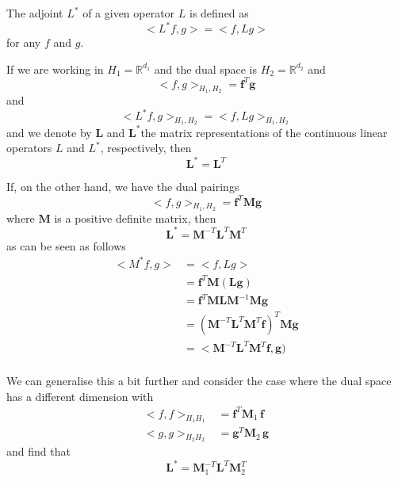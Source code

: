 \documentclass[10pt,a4paper]{book}
\begin{document}
The adjoint $L^\ast$ of a given operator $L$ is defined as
\[
< L^\ast f, g > =< f, L g>  
\]
for any $f$ and $g$. 

If we are working in $H_1=\mathbb{R}^{d_1}$ and the dual space is
$H_2=\mathbb{R}^{d_2}$ and
\[
 < f ,g >_{H_1 , H_2} = \bm{f}^T \bm{g}
\]
and
\[
< L^\ast f, g >_{H_1 , H_2}  =< f, L g>_{H_1 , H_2}   
\]
and we denote by $\bm{L}$ and $\bm{L}^\ast$the matrix representations
of the continuous linear operators $L$ and $L^\ast$, respectively,
then 
\[
 \bm{L}^\ast = \bm{L}^T
\]

If,  on the other hand, we have the dual pairings
\[
 < f ,g >_{H_1 , H_2}  = \bm{f}^T \bm{M} \bm{g}
\]
where $\bm{M}$ is a positive definite matrix, then
\[
\bm{L}^\ast=\bm{M}^{-T} \bm{L}^T \bm{M}^T
\] 
as can be seen as follows
\begin{align*}
 <M^\ast f, g> &= < f, L g> \\
              &= \bm{f}^T \bm{M} ( \bm{L} \bm{g}) \\
              &= \bm{f}^T \bm{M} \bm{L} \bm{M}^{-1} \bm{M}  \bm{g} \\
              &= (\bm{M}^{-T} \bm{L}^T \bm{M}^T \bm{f})^T  \bm{M}  \bm{g} \\
              &= <\bm{M}^{-T} \bm{L}^T \bm{M}^T \bm{f} ,  \bm{g}) \\
\end{align*}

We can generalise this a bit further and consider the case where the
dual space has a different dimension with
\begin{align*}
  <f,f>_{H_1 H_1} &= \bm{f}^T \bm{M}_1 \,\bm{f} \\
  <g,g>_{H_2 H_2} &= \bm{g}^T \bm{M}_2 \, \bm{g}
\end{align*}
and find that 
\[
\bm{L}^\ast=\bm{M}_1^{-T} \bm{L}^T \bm{M}_2^T
\]


\clearpage


\end{document}
